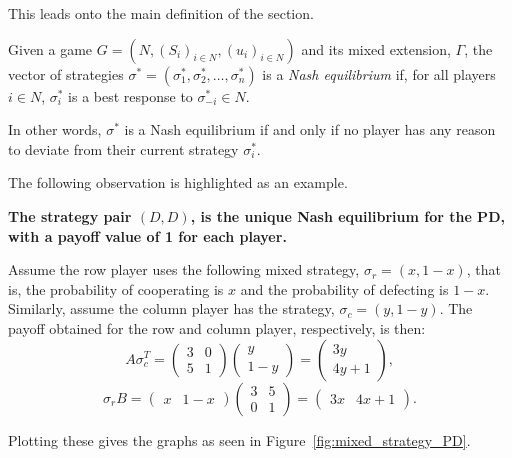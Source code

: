 This leads onto the main definition of the section.
\begin{definition}
    Given a game \(G=(N, {(S_{i})}_{i \in N}, {(u_{i})}_{i \in N})\) and its
    mixed extension, \(\Gamma \), the vector of
    strategies \(\sigma^{*} = (\sigma_{1}^{*}, \sigma_{2}^{*}, \ldots, \sigma_{n}^{*})\) is a
    \textit{Nash equilibrium} if, for all players \(i \in N\), \(\sigma_{i}^{*}\) is 
    a best response to \(\sigma_{-i}^{*} \in N\).
\end{definition}\label{def:NE}

In other words, \(\sigma^{*}\) is a Nash equilibrium if and only if no player has any
reason to deviate from their current strategy \(\sigma_{i}^{*}\).

The following observation is highlighted as an example.

\begin{center}
    \textbf{The strategy pair \((D, D)\), is the unique Nash equilibrium 
    for the PD, with a payoff value of 1 for each player.}
\end{center}

Assume the row player uses the following mixed strategy, \(\sigma_{r} = (x,
1-x)\), that is, the probability of cooperating is \(x\) and the probability of
defecting is \(1-x\). Similarly, assume the column player has 
the strategy, \(\sigma_{c} = (y, 1-y)\). The payoff obtained for the row and column player, respectively, is then:
\[
    A\sigma_{c}^T = \begin{pmatrix}
        3 & 0 \\
        5 & 1
    \end{pmatrix} \begin{pmatrix}
        y \\
        1-y
    \end{pmatrix} = \begin{pmatrix}
        3y \\
        4y + 1
    \end{pmatrix},
\]
\[
    \sigma_{r}B = \begin{pmatrix}
        x & 1-x
    \end{pmatrix} \begin{pmatrix}
        3 & 5 \\
        0 & 1        
    \end{pmatrix}  = \begin{pmatrix}
        3x & 4x + 1
    \end{pmatrix}.
\]

Plotting these gives the graphs as seen in Figure~\ref{fig:mixed_strategy_PD}.

